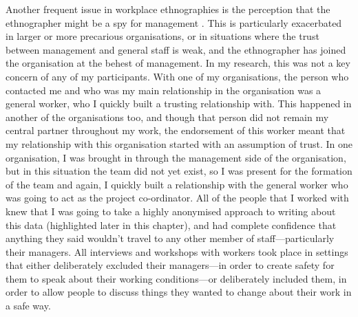 Another frequent issue in workplace ethnographies is the perception that the ethnographer might be a spy for management \citep{baum-talmor_its_2019}. This is particularly exacerbated in larger or more precarious organisations, or in situations where the trust between management and general staff is weak, and the ethnographer has joined the organisation at the behest of management. In my research, this was not a key concern of any of my participants. With one of my organisations, the person who contacted me and who was my main relationship in the organisation was a general worker, who I quickly built a trusting relationship with. This happened in another of the organisations too, and though that person did not remain my central partner throughout my work, the endorsement of this worker meant that my relationship with this organisation started with an assumption of trust. In one organisation, I was brought in through the management side of the organisation, but in this situation the team did not yet exist, so I was present for the formation of the team and again, I quickly built a relationship with the general worker who was going to act as the project co-ordinator. All of the people that I worked with knew that I was going to take a highly anonymised approach to writing about this data (highlighted later in this chapter), and had complete confidence that anything they said wouldn’t travel to any other member of staff—particularly their managers. All interviews and workshops with workers took place in settings that either deliberately excluded their managers—in order to create safety for them to speak about their working conditions—or deliberately included them, in order to allow people to discuss things they wanted to change about their work in a safe way.  

